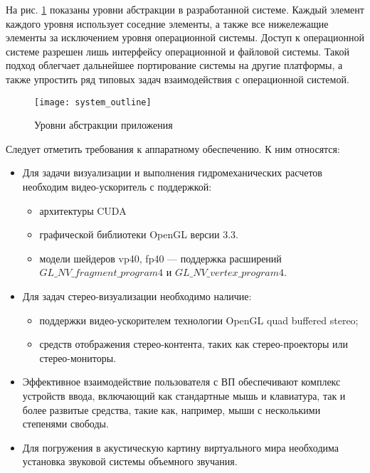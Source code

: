 На рис. \ref{ship_dfd} показаны уровни абстракции в разработанной системе. 
Каждый элемент каждого уровня использует соседние элементы, а также все нижележащие элементы за исключением уровня операционной системы. Доступ к операционной системе разрешен лишь интерфейсу операционной и файловой системы. Такой подход облегчает дальнейшее портирование системы на другие платформы, а также упростить ряд типовых задач взаимодействия с операционной системой.

\begin{figure}[ht]
	\begin{center}
	\texttt{[image: system\_outline]}
	\end{center}
	\caption{Уровни абстракции приложения}
	\label{ship_dfd}
\end{figure}

Следует отметить требования к аппаратному обеспечению. К ним относятся:
\begin{itemize}
	\item	Для задачи визуализации и выполнения гидромеханических расчетов необходим 
	видео-ускоритель с поддержкой:
		\begin{itemize}
			\item	архитектуры CUDA
			\item	графической библиотеки OpenGL версии 3.3.
			\item	модели шейдеров  vp40, fp40 --- поддержка расширений \linebreak
			$GL\_NV\_fragment\_program4$ и $GL\_NV\_vertex\_program4$.
		\end{itemize}
	\item	Для задач стерео-визуализации необходимо наличие:
		\begin{itemize}
			\item	поддержки видео-ускорителем технологии OpenGL quad buffered stereo;
			\item	средств отображения стерео-контента, 
					таких как стерео-проекторы или стерео-мониторы.
		\end{itemize}	
	\item	Эффективное взаимодействие пользователя с ВП обеспечивают комплекс устройств ввода, включающий как стандартные мышь и клавиатура, так и более развитые средства, такие как, например, мыши с несколькими степенями свободы.
	\item 	Для погружения в акустическую картину виртуального мира необходима установка звуковой системы объемного звучания. 
\end{itemize}

